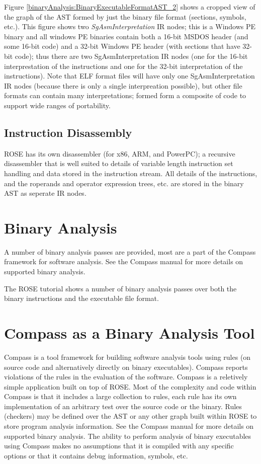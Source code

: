 Figure \ref{binaryAnalysis:BinaryExecutableFormatAST_2} shows a cropped view of the graph
of the AST formed by just the binary file format (sections, symbols, etc.).  This figure
shows two {\em SgAsmInterpretation} IR nodes; this is a Windows PE binary and all windows
PE binaries contain both a 16-bit MSDOS header (and some 16-bit code) and a 32-bit Windows
PE header (with sections that have 32-bit code); thus there are two SgAsmInterpretation IR
nodes (one for the 16-bit interprestation of the instructions and one for the 32-bit 
interpretation of the instructions).  Note that ELF format files will have only one
SgAsmInterpretation IR nodes (because there is only a single interpreation possible), but
other file formats can contain many interpretations; formed form a composite of code to
support wide ranges of portability.


\subsection{Instruction Disassembly}

    ROSE has its own disassembler (for x86, ARM, and PowerPC); a recursive disassembler that is well suited to
details of variable length instruction set handling and data stored in the instruction
stream.  All details of the instructions, and the roperands and operator expression trees,
etc. are stored in the binary AST as seperate IR nodes.

\section{Binary Analysis}

   A number of binary analysis passes are provided, most are a part of the Compass
framework for software analysis.  See the Compass manual for more details on supported
binary analysis.

   The ROSE tutorial shows a number of binary analysis passes over both the binary
instructions and the executable file format.

\section{Compass as a Binary Analysis Tool}

   Compass is a tool framework for building software analysis tools using rules (on source
code and alternatively directly on binary executables). Compass
reports violations of the rules in the evaluation of the software.  Compass is a
reletively simple application built on top of ROSE.  Most of the complexity and code 
within Compass is that it includes a large collection to rules, each rule has its
own implementation of an arbitrary test over the source code or the binary.  Rules
(checkers) may be defined over the AST or any other graph built within ROSE to store 
program analysis information. See the Compass manual for more details on supported
binary analysis.  The ability to perform analysis of binary executables using Compass 
makes no assumptions that it is compiled with any specific options or that it contains
debug information, symbols, etc.


